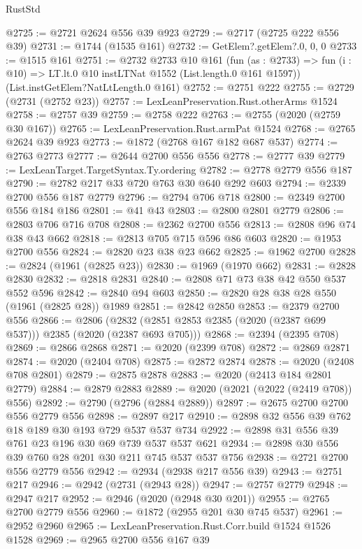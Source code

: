 \begin{lexlean}{RustStd}
\begin{coremodule}
@2725 := @2721 @2624 @556 @39 @923
@2729 := @2717 (@2725 @222 @556 @39)
@2731 := @1744 (@1535 @161)
@2732 := GetElem?.getElem?.{0, 0, 0}
@2733 := @1515 @161
@2751 := @2732
    @2733
    @10
    @161
    (fun (as : @2733) =>
    fun (i : @10) => LT.lt.{0} @10 instLTNat @1552 (List.length.{0} @161 @1597))
    (List.instGetElem?NatLtLength.{0} @161)
@2752 := @2751 @222
@2755 := @2729 (@2731 (@2752 @23))
@2757 := LexLeanPreservation.Rust.otherArms @1524
@2758 := @2757 @39
@2759 := @2758 @222
@2763 := @2755 (@2020 (@2759 @30 @167))
@2765 := LexLeanPreservation.Rust.armPat @1524
@2768 := @2765 @2624 @39 @923
@2773 := @1872 (@2768 @167 @182 @687 @537)
@2774 := @2763 @2773
@2777 := @2644 @2700 @556 @556
@2778 := @2777 @39
@2779 := LexLeanTarget.TargetSyntax.Ty.ordering
@2782 := @2778 @2779 @556 @187
@2790 := @2782 @217 @33 @720 @763 @30 @640 @292 @603
@2794 := @2339 @2700 @556 @187 @2779
@2796 := @2794 @706 @718
@2800 := @2349 @2700 @556 @184 @186
@2801 := @41 @43
@2803 := @2800 @2801 @2779
@2806 := @2803 @706 @716 @708
@2808 := @2362 @2700 @556
@2813 := @2808 @96 @74 @38 @43 @662
@2818 := @2813 @705 @715 @596 @86 @603
@2820 := @1953 @2700 @556
@2824 := @2820 @23 @38 @23 @662
@2825 := @1962 @2700
@2828 := @2824 (@1961 (@2825 @23))
@2830 := @1969 (@1970 @662)
@2831 := @2828 @2830
@2832 := @2818 @2831
@2840 := @2808 @71 @73 @38 @42 @550 @537 @552 @596
@2842 := @2840 @94 @603
@2850 := @2820 @28 @38 @28 @550 (@1961 (@2825 @28)) @1989
@2851 := @2842 @2850
@2853 := @2379 @2700 @556
@2866 := @2806 (@2832 (@2851 @2853 @2385 (@2020 (@2387 @699 @537))) @2385 (@2020 (@2387 @693 @705)))
@2868 := @2394 (@2395 @708)
@2869 := @2866 @2868
@2871 := @2020 (@2399 @708)
@2872 := @2869 @2871
@2874 := @2020 (@2404 @708)
@2875 := @2872 @2874
@2878 := @2020 (@2408 @708 @2801)
@2879 := @2875 @2878
@2883 := @2020 (@2413 @184 @2801 @2779)
@2884 := @2879 @2883
@2889 := @2020 (@2021 (@2022 (@2419 @708)) @556)
@2892 := @2790 (@2796 (@2884 @2889))
@2897 := @2675 @2700 @2700 @556 @2779 @556
@2898 := @2897 @217
@2910 := @2898 @32 @556 @39 @762 @18 @189 @30 @193 @729 @537 @537 @734
@2922 := @2898 @31 @556 @39 @761 @23 @196 @30 @69 @739 @537 @537 @621
@2934 := @2898 @30 @556 @39 @760 @28 @201 @30 @211 @745 @537 @537 @756
@2938 := @2721 @2700 @556 @2779 @556
@2942 := @2934 (@2938 @217 @556 @39)
@2943 := @2751 @217
@2946 := @2942 (@2731 (@2943 @28))
@2947 := @2757 @2779
@2948 := @2947 @217
@2952 := @2946 (@2020 (@2948 @30 @201))
@2955 := @2765 @2700 @2779 @556
@2960 := @1872 (@2955 @201 @30 @745 @537)
@2961 := @2952 @2960
@2965 := LexLeanPreservation.Rust.Corr.build @1524 @1526 @1528
@2969 := @2965 @2700 @556 @167 @39

\end{coremodule}
\end{lexlean}

